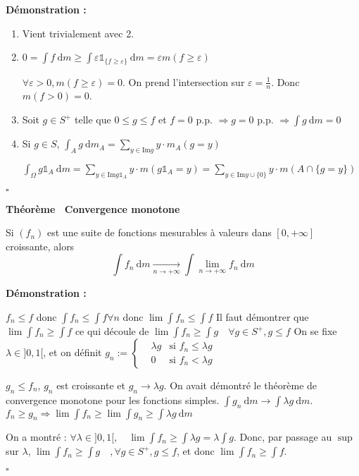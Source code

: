 \documentclass[10pt,a4paper,notitlepage ]{report}
\newcommand{\dd}{\ \mathrm d}
\newcommand{\1}{\mathds 1}
\newcommand{\eps}{\varepsilon}
\renewcommand{\Im}{\mathrm{Im }}
\newcounter{th}
\newenvironment{theorem}[1][]{
\refstepcounter{th}
\begin{tcolorbox}
	\textbf{Théorème \theth \ #1}
	
	
}{\end{tcolorbox}}
\newenvironment{demo}[1][]{

	\textbf{Démonstration #1 :}
}{\begin{flushright}
	$\square$
\end{flushright}
}
\begin{document}
\begin{demo}
	\begin{enumerate}
		\item Vient trivialement avec 2.
		\item $0=\int f\dd m \ge \int \eps \mathds 1_{\{f\ge \eps\}} \dd m =\eps m(f\ge \eps)$
		
		$\forall \eps > 0, m(f\ge \eps) = 0$. On prend l'intersection sur $\eps = \frac 1 n$. Donc $m(f>0) = 0$.
		\item Soit $g\in S^+$ telle que $0 \le g\le f$ et $f=0$ p.p. $\Rightarrow g =0$ p.p. $\Rightarrow \int g \dd m = 0$
		\item Si $g \in S$, $\int_A g \dd m_A = \underset{y \in \Im g}\sum y\cdot m_A(g=y)$
		
		$\int_\Omega g \mathds 1_A \dd m = \underset{y\in\Im g\mathds 1_A}\sum y \cdot m(g\mathds 1_A=y) = \underset{y\in \Im y \cup \{0\}}\sum y\cdot m(A\cap \{g=y\})$
	\end{enumerate}
\end{demo}

\begin{theorem}[Convergence monotone]
	Si $(f_n)$ est une suite de fonctions mesurables à valeurs dans $[0,+\infty]$ croissante, alors 
	\[ \int f_n \dd m \underset{n\rightarrow + \infty} \longrightarrow \int \underset{n\rightarrow + \infty} \lim f_n \dd m \]
\end{theorem}

\begin{demo}
	$f_n \le f$ donc $\int f_n \le \int f \forall n$ donc $\lim \int f_n \le \int f$
	Il faut démontrer que $\lim \int f_n \ge \int f$ ce qui découle de $\lim \int f_n \ge \int g \quad \forall g\in S^+, g\le f$
	On se fixe $\lambda \in ]0,1[$, et on définit $g_n := \left\{ \begin{aligned}
		&\lambda g &\text{si } f_n\le \lambda g \\
		& 0 &\text{si } f_n < \lambda g
	\end{aligned}\right.$

	$g_n \le f_n$, $g_n$ est croissante et $g_n \rightarrow \lambda g$. On avait démontré le théorème de convergence monotone pour les fonctions simples.
	$\int g_n \dd m \rightarrow \int \lambda g \dd m$.
	$f_n \ge g_n \Rightarrow \lim\int f_n \ge \lim \int g_n \ge \int \lambda g \dd m$
	
	On a montré : $\forall \lambda \in ]0,1[, \quad \lim \int f_n \ge \int \lambda g = \lambda \int g$. Donc, par passage au $\sup$ sur $\lambda$, $\lim \int f_n \ge \int g \quad, \forall g \in S^+, g \le f$, et donc $\lim \int f_n \ge \int f$.
\end{demo}
\end{document}
